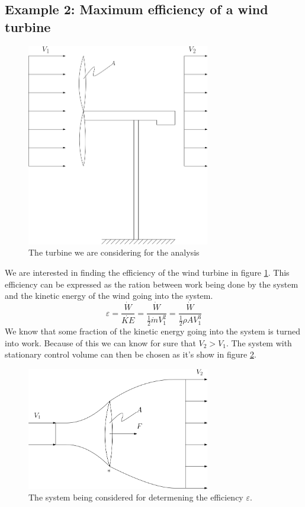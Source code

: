 \documentclass[11pt, a4paper]{article}
\renewcommand\epsilon{\varepsilon}
\begin{document}
\subsection{Example 2: Maximum efficiency of a wind turbine}
\begin{figure}[H]
  \centerline{\includegraphics[width=80mm]{images/Turbine.png}}
  \caption{The turbine we are considering for the analysis}
  \label{fig:turbine}
\end{figure}
We are interested in finding the efficiency of the wind turbine in figure \ref{fig:turbine}. This efficiency can be expressed as the ration between work being done by the system and the kinetic energy of the wind going into the system.
\begin{equation*}
  \epsilon = \frac{\dot{W}}{\dot{KE}} = \frac{\dot{W}}{\frac{1}{2}\dot{m}V_1^2} = \frac{\dot{W}}{\frac{1}{2}\rho A V_1^3}
\end{equation*}
We know that some fraction of the kinetic energy going into the system is turned into work. Because of this we can know for sure that $V_2>V_1$. The system with stationary control volume can then be chosen as it's show in figure \ref{fig:TurbineSystem}.
\begin{figure}[h]
  \centerline{\includegraphics[width=80mm]{images/Turbine_System.png}}
  \caption{The system being considered for determening the efficiency $\epsilon$.}
  \label{fig:TurbineSystem}
\end{figure}
\end{document}
